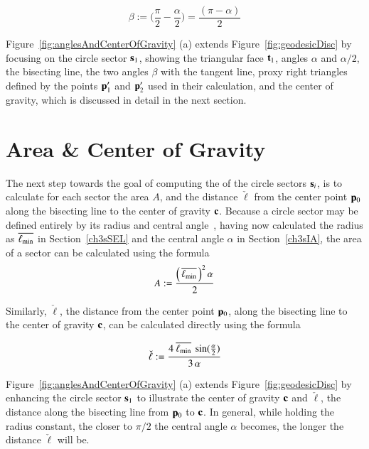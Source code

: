 \begin{equation}
	\beta := \Big(\frac{\pi}{2} - \frac{\alpha}{2}\Big) = \frac{(\pi - \alpha)}{2}
	\label{eq:betaFromHalfAlpha}
\end{equation}%
%
%

Figure~\ref{fig:anglesAndCenterOfGravity} (a) extends Figure~\ref{fig:geodesicDisc} by focusing on the circle sector $\mathbf{s}_1$, showing the triangular face $\mathbf{t}_1$, angles $\alpha$ and $\alpha/2$, the bisecting line, the two angles $\beta$ with the tangent line, proxy right triangles defined by the points $\mathbf{p}'_1$ and $\mathbf{p}'_2$ used in their calculation, and the center of gravity, which is discussed in detail in the next section.

%
%
%
%
\section{Area \& Center of Gravity}
\label{ch3sACG}
The next step towards the goal of computing the  of the circle sectors $\mathbf{s}_i$, is to calculate for each sector the area $A$, and the distance $\check{\ell}$ from the center point $\mathbf{p}_0$ along the bisecting line to the center of gravity $\mathbf{c}$. Because a circle sector may be defined entirely by its radius and central angle~\cite{Weisstein19d}, having now calculated the radius as $\overline{\ell_\text{min}}$ in Section~\ref{ch3sSEL} and the central angle $\alpha$ in Section~\ref{ch3sIA}, the area of a sector can be calculated using the formula
%
\begin{equation}
	A := \frac{\left (\,\overline{\ell_\text{min}}\,\right )^2\alpha}{2}
	\label{eq:circularSectorArea}
\end{equation}

Similarly, $\check{\ell}$, the distance from the center point $\mathbf{p}_0$, along the bisecting line to the center of gravity $\mathbf{c}$, can be calculated directly using the formula

\begin{equation}
	\check{\ell} := \frac{4\:\overline{\ell_\text{min}}\:\sin(\frac{\alpha}{2})}{3\,\alpha}
	\label{eq:distToCoG}
\end{equation}%

Figure~\ref{fig:anglesAndCenterOfGravity} (a) extends Figure~\ref{fig:geodesicDisc} by enhancing the circle sector $\mathbf{s}_1$ to illustrate the center of gravity $\mathbf{c}$ and $\check{\ell}$, the distance along the bisecting line from $\mathbf{p}_0$ to $\mathbf{c}$. In general, while holding the radius constant, the closer to $\pi/2$ the central angle $\alpha$ becomes, the longer the distance $\check{\ell}$ will be.

